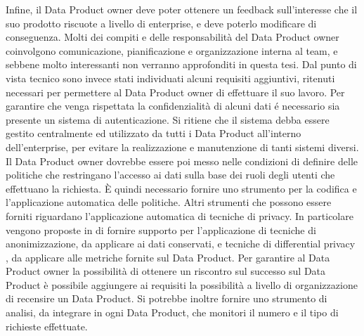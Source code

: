 \documentclass[12pt]{report}
\begin{document}
Infine, il Data Product owner deve poter ottenere un feedback sull'interesse che il suo prodotto riscuote a livello di enterprise, e deve poterlo modificare di conseguenza.
Molti dei compiti e delle responsabilità del Data Product owner coinvolgono comunicazione, pianificazione e organizzazione interna al team, e sebbene molto interessanti non verranno approfonditi in questa tesi.
Dal punto di vista tecnico sono invece stati individuati alcuni requisiti aggiuntivi, ritenuti necessari per permettere al Data Product owner di effettuare il suo lavoro.
Per garantire che venga rispettata la confidenzialità di alcuni dati é necessario sia presente un sistema di autenticazione.
Si ritiene che il sistema debba essere gestito centralmente ed utilizzato da tutti i Data Product all'interno dell'enterprise, per evitare la realizzazione e manutenzione di tanti sistemi diversi. 
Il Data Product owner dovrebbe essere poi messo nelle condizioni di definire delle politiche che restringano l'accesso ai dati sulla base dei ruoli degli utenti che effettuano la richiesta.
È quindi necessario fornire uno strumento per la codifica e l'applicazione automatica delle politiche.
Altri strumenti che possono essere forniti riguardano l'applicazione automatica di tecniche di privacy. 
In particolare vengono proposte in \cite{dehghani_data_2022} di fornire supporto per l'applicazione di tecniche di anonimizzazione, da applicare ai dati conservati, e tecniche di differential privacy \cite{dwork2006differential}, da applicare alle metriche fornite sul Data Product.
Per garantire al Data Product owner la possibilità di ottenere un riscontro sul successo sul Data Product è possibile aggiungere ai requisiti la possibilità a livello di organizzazione di recensire un Data Product. 
Si potrebbe inoltre fornire uno strumento di analisi, da integrare in ogni Data Product, che monitori il numero e il tipo di richieste effettuate.
\end{document}
